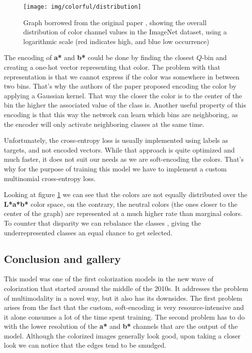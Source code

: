 \begin{figure}[!ht]
	\centering
	\texttt{[image: img/colorful/distribution]}
    \caption{Graph borrowed from the original paper \citep{zhang2016colorful}, 
	showing the overall distribution of color channel values in the ImageNet
	dataset, using a logarithmic scale (red indicates high, and blue low occurrence)}
	\label{fig:distribution}
\end{figure}

The encoding of \textbf{a*} and \textbf{b*} could be done by finding the 
closest $Q$-bin and creating a one-hot vector representing that color. The 
problem with that representation is that we cannot express if the color
was somewhere in between two bins. That's why the authors of the 
paper proposed encoding the color by applying a Gaussian kernel. That way
the closer the color is to the center of the bin the higher the associated
value of the class is. Another useful property of this encoding is that this way
the network can learn which bins are neighboring, as the encoder will only 
activate neighboring classes at the same time.

Unfortunately, the cross-entropy loss is usually implemented using labels as targets,
and not encoded vectors. While that approach is quite optimized and much faster, 
it does not suit our needs as we are soft-encoding the colors. That's why for 
the purpose of training this model we have to implement a custom multinomial 
cross-entropy loss.

Looking at figure \ref{fig:distribution} we can see that the colors are not 
equally distributed over the \textbf{L*a*b*} color space, on the contrary,
the neutral colors (the ones closer to the center of the graph) are represented
at a much higher rate than marginal colors. To counter that disparity we can
rebalance the classes \citep{tantithamthavorn2020rebalancing}, giving the 
underrepresented classes an equal chance to get selected.

\subsection{Conclusion and gallery}

This model was one of the first colorization models in the new wave of 
colorization that started around the middle of the 2010s. It addresses
the problem of multimodality in a novel way, but it also has its downsides.
The first problem arises from the fact that the custom, soft-encoding is 
very resource-intensive and it alone consumes a lot of the time spent training. 
The second problem has to do with the lower resolution of the \textbf{a*} and \textbf{b*}
channels that are the output of the model. Although the colorized images 
generally look good, upon taking a closer look we can notice that the 
edges tend to be smudged. 

